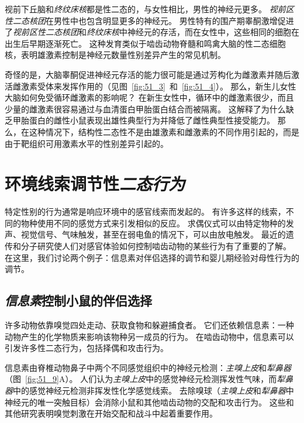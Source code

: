 视前下丘脑和\textit{终纹床核}都是性二态的，与女性相比，男性的神经元更多。
\textit{视前区性二态核团}在男性中也包含明显更多的神经元。
男性特有的围产期睾酮激增促进了\textit{视前区性二态核团}和\textit{终纹床核}中神经元的存活，而在女性中，这些相同的细胞在出生后早期逐渐死亡。
这种发育类似于啮齿动物脊髓和鸣禽大脑的性二态细胞核，表明雄激素控制是神经元数量性别差异产生的常见机制。


奇怪的是，大脑睾酮促进神经元存活的能力很可能是通过芳构化为雌激素并随后激活雌激素受体来发挥作用的（见图~\ref{fig:51_3}~和~\ref{fig:51_4}）。
那么，新生儿女性大脑如何免受循环雌激素的影响呢？
在新生女性中，循环中的雌激素很少，而且少量的雌激素很容易通过与血清蛋白甲胎蛋白结合而被隔离。
这解释了为什么缺乏甲胎蛋白的雌性小鼠表现出雄性典型行为并降低了雌性典型性接受能力。
那么，在这种情况下，结构性二态性不是由雄激素和雌激素的不同作用引起的，而是由于靶组织可用激素水平的性别差异引起的。



\section{环境线索调节性\textit{二态行为}}

特定性别的行为通常是响应环境中的感官线索而发起的。
有许多这样的线索，不同的物种使用不同的感觉方式来引发相似的反应。
求偶仪式可以由特定物种的发声、视觉信号、气味触发，甚至在弱电鱼的情况下，可以由放电触发。
最近的遗传和分子研究使人们对感官体验如何控制啮齿动物的某些行为有了重要的了解。
在这里，我们讨论两个例子：信息素对伴侣选择的调节和婴儿期经验对母性行为的调节。



\subsection{\textit{信息素}控制小鼠的伴侣选择}
许多动物依靠嗅觉四处走动、获取食物和躲避捕食者。
它们还依赖信息素：一种动物产生的化学物质来影响该物种另一成员的行为。
在啮齿动物中，信息素可以引发许多性二态行为，包括择偶和攻击行为。


信息素由脊椎动物鼻子中两个不同感觉组织中的神经元检测：\textit{主嗅上皮}和\textit{犁鼻器}（图~\ref{fig:51_9}A）。
人们认为\textit{主嗅上皮}中的感觉神经元检测挥发性气味，而\textit{犁鼻器}中的感觉神经元检测非挥发性化学感觉线索。
去除嗅球（\textit{主嗅上皮}和\textit{犁鼻器}中神经元的唯一突触目标）会消除小鼠和其他啮齿动物的交配和攻击行为。
这些和其他研究表明嗅觉刺激在开始交配和战斗中起着重要作用。


